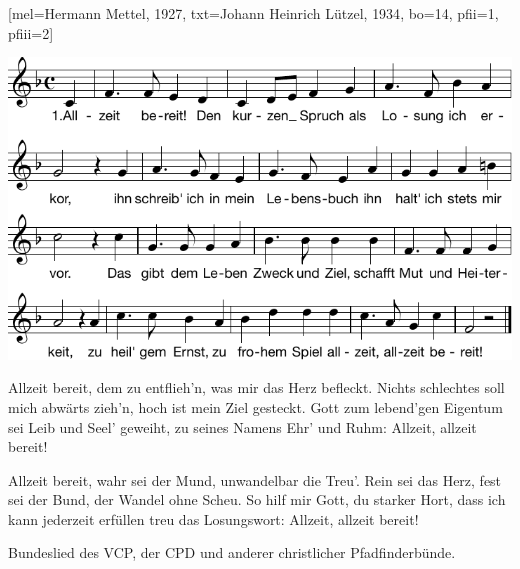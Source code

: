 [mel={Hermann Mettel, 1927}, txt={Johann Heinrich Lützel, 1934}, bo={14}, pfii={1}, pfiii={2}]

\beginverse 
\endverse  
\centering\includegraphics[width=1\textwidth]{Noten/Lied003.pdf}	

\beginverse
Allzeit bereit, dem zu entflieh'n, was mir das Herz befleckt.
Nichts schlechtes soll mich abwärts zieh'n, hoch ist mein Ziel gesteckt.
Gott zum lebend'gen Eigentum sei Leib und Seel' geweiht,
zu seines Namens Ehr' und Ruhm: Allzeit, allzeit bereit!
\endverse

\beginverse
Allzeit bereit, wahr sei der Mund, unwandelbar die Treu'.
Rein sei das Herz, fest sei der Bund, der Wandel ohne Scheu.
So hilf mir Gott, du starker Hort, dass ich kann jederzeit
erfüllen treu das Losungswort: Allzeit, allzeit bereit!
\endverse

\endsong

\beginscripture{}
Bundeslied des VCP, der CPD und anderer christlicher Pfadfinderbünde.
\endscripture
